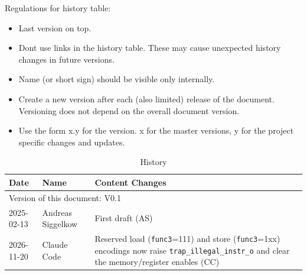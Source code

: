 Regulations for history table:
\begin{itemize}
  \item Last version on top.
  \item Dont use links in the history table. These may cause unexpected history changes in future versions.
  \item Name (or short sign) should be visible only internally.
  \item Create a new version after each (also limited) release of the document. Versioning does not depend on the overall document version.
  \item Use the form x.y for the version. x for the master versions, y for the project specific changes and updates.
\end{itemize}

\begin{table}[H]
\caption{History}
\label{tab:dechistory01}
\centering
\begin{tabularx}{\textwidth}{|X |X |X |}
  \hline
  Date & Name & Content Changes \\
  \hline
  \multicolumn{3}{|l|}{Version of this document: V0.1} \\
  \hline
  2025-02-13 & Andreas Siggelkow & First draft (AS) \\
  \hline
  2026-11-20 & Claude Code & Reserved load (\texttt{func3}=111) and store (\texttt{func3}=1xx) encodings now raise \texttt{trap\_illegal\_instr\_o} and clear the memory/register enables (CC) \\
  \hline
\end{tabularx}
\end{table}
